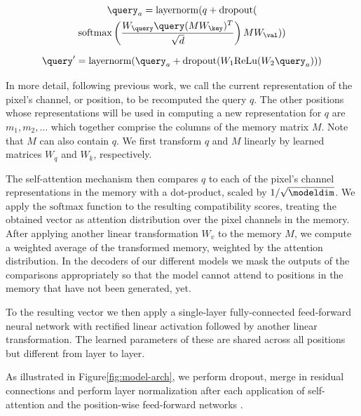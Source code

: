 \begin{multline}
\query_{a} = \mathrm{layernorm}(q + \mathrm{dropout}( \\ 
\mathrm{softmax}\left(\frac{W_{\query} \query (M W_{\key})^T }{\sqrt{d}} \right) M W_{\val}))
\label{eqn:self-attention}
\end{multline}

\begin{equation}
\query' = \mathrm{layernorm}(\query_{a} + \mathrm{dropout} (W_1 \mathrm{ReLu}(W_2 \query_{a})))
\label{eqn:FFNN}
\end{equation}


In more detail, following previous work, we call the current representation of the pixel's channel, or position, to be recomputed the query $q$. The other positions whose representations will be used in computing a new representation for $q$ are $m_1, m_2, \ldots$ which together comprise the columns of the memory matrix $M$.
Note that $M$ can also contain $q$. We first transform $q$ and $M$ linearly by learned matrices $W_q$ and $W_k$, respectively.

The self-attention mechanism then compares $q$ to each of the pixel's channel representations in the memory with a dot-product, scaled by $1/\sqrt{\modeldim}$. We apply the $\mathrm{softmax}$ function to the resulting compatibility scores, treating the obtained vector as attention distribution over the pixel channels in the memory. After applying another linear transformation $W_v$ to the memory $M$, we compute a weighted average of the transformed memory, weighted by the attention distribution. In the decoders of our different models we mask the outputs of the comparisons appropriately so that the model cannot attend to positions in the memory that have not been generated, yet.

To the resulting vector we then apply a single-layer fully-connected feed-forward neural network with rectified linear activation followed by another linear transformation. The learned parameters of these are shared across all positions but different from layer to layer.

As illustrated in Figure\ref{fig:model-arch}, we perform dropout, merge in residual connections and perform layer normalization after each application of self-attention and the position-wise feed-forward networks \citep{layernorm2016, srivastava2014dropout}.

